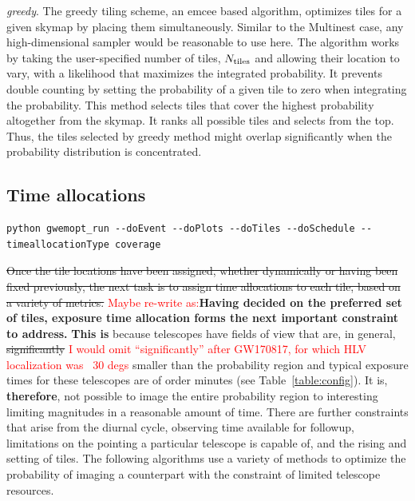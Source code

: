 \documentclass[twocolumn]{aastex62}
\begin{document}
\emph{greedy}. The greedy tiling scheme, an emcee \citep{FoHo2013} based algorithm, optimizes tiles for a given skymap by placing them simultaneously. Similar to the Multinest case, any high-dimensional sampler would be reasonable to use here. The algorithm works by taking the user-specified number of tiles, $N_{\rm tiles}$ and allowing their location to vary, with a likelihood that maximizes the integrated probability. It prevents double counting by setting the probability of a given tile to zero when integrating the probability. This method selects tiles that cover the highest probability altogether from the skymap. It ranks all possible tiles and selects from the top. Thus, the tiles selected by greedy method might overlap significantly when the probability distribution is concentrated. 

\subsection{Time allocations}
\label{subsection:timeallocation}
\begin{lstlisting}
python gwemopt_run --doEvent --doPlots --doTiles --doSchedule --timeallocationType coverage
\end{lstlisting}
\sout{Once the tile locations have been assigned, whether dynamically or having been fixed previously, the next task is to assign time allocations to each tile, based on a variety of metrics.}
\textcolor{red}{Maybe re-write as:}\textbf{Having decided on the preferred set of tiles, exposure time allocation forms the next important constraint to address.}
\textbf{This is }because telescopes have fields of view that are, in general, \sout{significantly} \textcolor{red}{I would omit ``significantly''  after GW170817, for which HLV localization was ~30 degs} smaller than the probability region and typical exposure times for these telescopes are of order minutes (see Table~\ref{table:config}). 
It is, \textbf{therefore}, not possible to image the entire probability region to interesting limiting magnitudes in a reasonable amount of time.
There are further constraints that arise from the diurnal cycle, observing time available for followup, limitations on the pointing a particular telescope is capable of, and the rising and setting of tiles.
The following algorithms use a variety of methods to optimize the probability of imaging a counterpart with the constraint of limited telescope resources.
\end{document}
